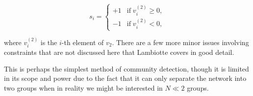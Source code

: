 $$ s_i = \begin{cases}
    +1 & \text{if} \; v_i^{(2)} \geq 0, \\
    -1 & \text{if} \; v_i^{(2)} < 0,
\end{cases} $$

where $v_i^{(2)}$ is the $i$-th element of $v_2$. There are a few more minor issues involving constraints that are not discussed here that Lambiotte covers in good detail.\cite[27]{oxford:renaud_notes}

This is perhaps the simplest method of community detection, though it is limited in its scope and power due to the fact that it can only separate the network into two groups when in reality we might be interested in $N \ll 2$ groups.

%
%
%
